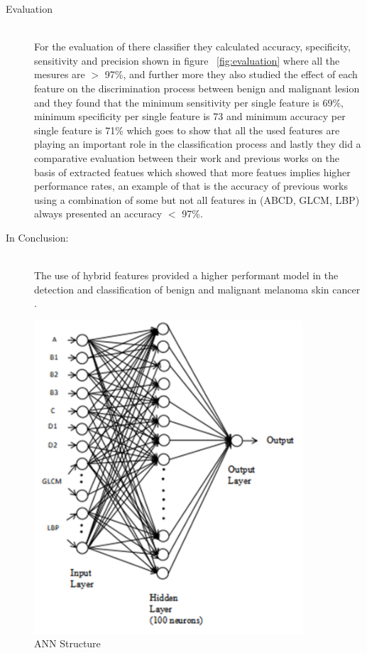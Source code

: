 \begin{description}
    \item [Evaluation] \hfill \\
        For the evaluation of there classifier they calculated accuracy, specificity, sensitivity and precision shown in figure ~\ref{fig:evaluation}  where all the mesures are $>$ 97\%, and further more they also studied the effect of each feature on the discrimination process between benign and malignant lesion and they found that the minimum sensitivity per single feature is 69\%, minimum specificity per single feature is 73 and minimum accuracy per single feature is 71\% which goes to show that all the used features are playing an important role in the classification process and lastly they did a comparative evaluation between their work and previous works on the basis of extracted featues which showed that more featues implies higher performance rates, an example of that is the accuracy of previous works using a combination of some but not all features in (ABCD, GLCM, LBP) always presented an accuracy $<$ 97\%.

    \item [In Conclusion: ] \hfill \\
    The use of hybrid features provided a higher performant model in the detection and classification of benign and malignant melanoma skin cancer .
    \end{description}


\begin{figure}[htbp]
\begin{center}
\includegraphics[width=10cm]{./chapter-03-state-of-the-art/ann.png}
\end{center}
\caption{ANN Structure}
\label{fig:ann}
\end{figure}

